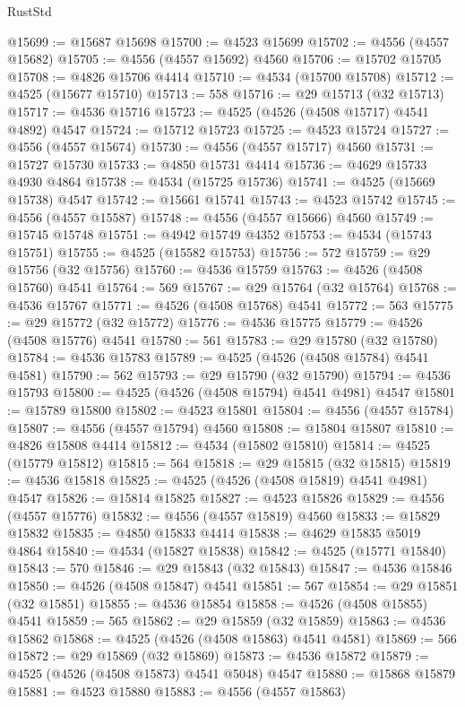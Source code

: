 \begin{lexlean}{RustStd}
\begin{coremodule}
@15699 := @15687 @15698
@15700 := @4523 @15699
@15702 := @4556 (@4557 @15682)
@15705 := @4556 (@4557 @15692) @4560
@15706 := @15702 @15705
@15708 := @4826 @15706 @4414
@15710 := @4534 (@15700 @15708)
@15712 := @4525 (@15677 @15710)
@15713 := 558
@15716 := @29 @15713 (@32 @15713)
@15717 := @4536 @15716
@15723 := @4525 (@4526 (@4508 @15717) @4541 @4892) @4547
@15724 := @15712 @15723
@15725 := @4523 @15724
@15727 := @4556 (@4557 @15674)
@15730 := @4556 (@4557 @15717) @4560
@15731 := @15727 @15730
@15733 := @4850 @15731 @4414
@15736 := @4629 @15733 @4930 @4864
@15738 := @4534 (@15725 @15736)
@15741 := @4525 (@15669 @15738) @4547
@15742 := @15661 @15741
@15743 := @4523 @15742
@15745 := @4556 (@4557 @15587)
@15748 := @4556 (@4557 @15666) @4560
@15749 := @15745 @15748
@15751 := @4942 @15749 @4352
@15753 := @4534 (@15743 @15751)
@15755 := @4525 (@15582 @15753)
@15756 := 572
@15759 := @29 @15756 (@32 @15756)
@15760 := @4536 @15759
@15763 := @4526 (@4508 @15760) @4541
@15764 := 569
@15767 := @29 @15764 (@32 @15764)
@15768 := @4536 @15767
@15771 := @4526 (@4508 @15768) @4541
@15772 := 563
@15775 := @29 @15772 (@32 @15772)
@15776 := @4536 @15775
@15779 := @4526 (@4508 @15776) @4541
@15780 := 561
@15783 := @29 @15780 (@32 @15780)
@15784 := @4536 @15783
@15789 := @4525 (@4526 (@4508 @15784) @4541 @4581)
@15790 := 562
@15793 := @29 @15790 (@32 @15790)
@15794 := @4536 @15793
@15800 := @4525 (@4526 (@4508 @15794) @4541 @4981) @4547
@15801 := @15789 @15800
@15802 := @4523 @15801
@15804 := @4556 (@4557 @15784)
@15807 := @4556 (@4557 @15794) @4560
@15808 := @15804 @15807
@15810 := @4826 @15808 @4414
@15812 := @4534 (@15802 @15810)
@15814 := @4525 (@15779 @15812)
@15815 := 564
@15818 := @29 @15815 (@32 @15815)
@15819 := @4536 @15818
@15825 := @4525 (@4526 (@4508 @15819) @4541 @4981) @4547
@15826 := @15814 @15825
@15827 := @4523 @15826
@15829 := @4556 (@4557 @15776)
@15832 := @4556 (@4557 @15819) @4560
@15833 := @15829 @15832
@15835 := @4850 @15833 @4414
@15838 := @4629 @15835 @5019 @4864
@15840 := @4534 (@15827 @15838)
@15842 := @4525 (@15771 @15840)
@15843 := 570
@15846 := @29 @15843 (@32 @15843)
@15847 := @4536 @15846
@15850 := @4526 (@4508 @15847) @4541
@15851 := 567
@15854 := @29 @15851 (@32 @15851)
@15855 := @4536 @15854
@15858 := @4526 (@4508 @15855) @4541
@15859 := 565
@15862 := @29 @15859 (@32 @15859)
@15863 := @4536 @15862
@15868 := @4525 (@4526 (@4508 @15863) @4541 @4581)
@15869 := 566
@15872 := @29 @15869 (@32 @15869)
@15873 := @4536 @15872
@15879 := @4525 (@4526 (@4508 @15873) @4541 @5048) @4547
@15880 := @15868 @15879
@15881 := @4523 @15880
@15883 := @4556 (@4557 @15863)

\end{coremodule}
\end{lexlean}
